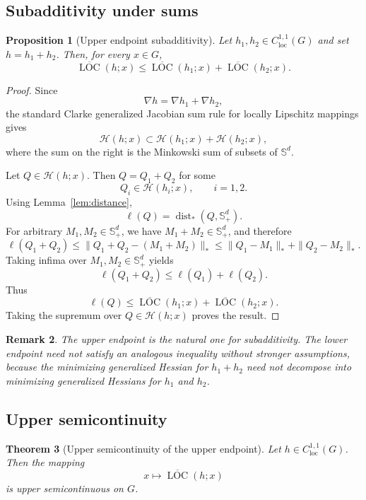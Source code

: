 \documentclass[11pt]{article}
\numberwithin{equation}{section}
\newtheorem{theorem}{Theorem}[section]
\newtheorem{proposition}[theorem]{Proposition}
\newtheorem{remark}[theorem]{Remark}
\newcommand{\Sd}{\mathbb S^d}
\newcommand{\Spd}{\mathbb S^d_+}
\newcommand{\dist}{\operatorname{dist}}
\newcommand{\Hess}{\mathcal H}
\newcommand{\LOC}{\operatorname{LOC}}
\begin{document}
	\subsection{Subadditivity under sums}
	
	\begin{proposition}[Upper endpoint subadditivity]
		\label{prop:sum}
		Let \(h_1,h_2\in C^{1,1}_{\mathrm{loc}}(G)\) and set \(h=h_1+h_2\). Then, for every \(x\in G\),
		\[
		\overline{\LOC}(h;x)
		\leq
		\overline{\LOC}(h_1;x)
		+
		\overline{\LOC}(h_2;x).
		\]
	\end{proposition}
	
	\begin{proof}
		Since
		\[
		\nabla h=\nabla h_1+\nabla h_2,
		\]
		the standard Clarke generalized Jacobian sum rule for locally Lipschitz mappings gives
		\[
		\Hess(h;x)
		\subset
		\Hess(h_1;x)+\Hess(h_2;x),
		\]
		where the sum on the right is the Minkowski sum of subsets of \(\Sd\).
		
		Let \(Q\in\Hess(h;x)\). Then \(Q=Q_1+Q_2\) for some
		\[
		Q_i\in\Hess(h_i;x),
		\qquad i=1,2.
		\]
		Using Lemma~\ref{lem:distance},
		\[
		\ell(Q)
		=
		\dist_*(Q,\Spd).
		\]
		For arbitrary \(M_1,M_2\in\Spd\), we have \(M_1+M_2\in\Spd\), and therefore
		\[
		\ell(Q_1+Q_2)
		\leq
		\|Q_1+Q_2-(M_1+M_2)\|_*
		\leq
		\|Q_1-M_1\|_*+\|Q_2-M_2\|_*.
		\]
		Taking infima over \(M_1,M_2\in\Spd\) yields
		\[
		\ell(Q_1+Q_2)
		\leq
		\ell(Q_1)+\ell(Q_2).
		\]
		Thus
		\[
		\ell(Q)
		\leq
		\overline{\LOC}(h_1;x)+\overline{\LOC}(h_2;x).
		\]
		Taking the supremum over \(Q\in\Hess(h;x)\) proves the result.
	\end{proof}
	
	\begin{remark}
		The upper endpoint is the natural one for subadditivity. The lower endpoint need not satisfy an analogous inequality without stronger assumptions, because the minimizing generalized Hessian for \(h_1+h_2\) need not decompose into minimizing generalized Hessians for \(h_1\) and \(h_2\).
	\end{remark}
	
	\subsection{Upper semicontinuity}
	
	\begin{theorem}[Upper semicontinuity of the upper endpoint]
		\label{thm:usc}
		Let \(h\in C^{1,1}_{\mathrm{loc}}(G)\). Then the mapping
		\[
		x\mapsto \overline{\LOC}(h;x)
		\]
		is upper semicontinuous on \(G\).
	\end{theorem}
	
\end{document}
